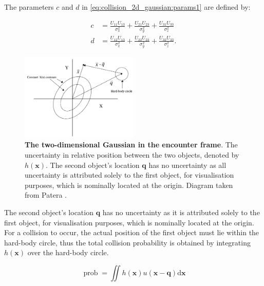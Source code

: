 The parameters $c$ and $d$ in \autoref{eq:collision_2d_gaussian:params1} are defined by:

\begin{equation}
    \begin{alignat}{2}
        c & =\frac{U_{11} U_{13}}{\sigma_{x}^{2}}+\frac{U_{21} U_{23}}{\sigma_{y}^{2}}+\frac{U_{31} U_{33}}{\sigma_{z}^{2}} \label{eq:collision_2d_gaussian:c}  \\
        d & =\frac{U_{12} U_{13}}{\sigma_{x}^{2}}+\frac{U_{22} U_{23}}{\sigma_{y}^{2}}+\frac{U_{32} U_{33}}{\sigma_{z}^{2}}. \label{eq:collision_2d_gaussian:d}
    \end{alignat}
\end{equation}


\begin{figure}
    \centering
    \captionsetup{format=hang} %
    \includegraphics[width=0.5\textwidth]{graphics/encounter-frame.png}
    \caption{\textbf{The two-dimensional Gaussian in the encounter frame}. The uncertainty in relative position between the two objects, denoted by $h(\boldsymbol{x})$. The second object's location $\boldsymbol{q}$ has no uncertainty as all uncertainty is attributed solely to the first object, for visualisation purposes, which is nominally located at the origin. Diagram taken from Patera \cite{Patera2001}.}
    \label{fig:collision_2d_gaussian}
\end{figure}

The second object's location $\boldsymbol{q}$ has no uncertainty as it is attributed solely to the first object, for visualisation purposes, which is nominally located at the origin. For a collision to occur, the actual position of the first object must lie within the hard-body circle, thus the total collision probability is obtained by integrating $h(\boldsymbol{x})$ over the hard-body circle.

\begin{equation}
    \operatorname{prob}=\iint h(\boldsymbol{x}) u(\boldsymbol{x}-\boldsymbol{q}) \mathrm{d} \boldsymbol{x}
    \label{eq:prob2}
\end{equation}

